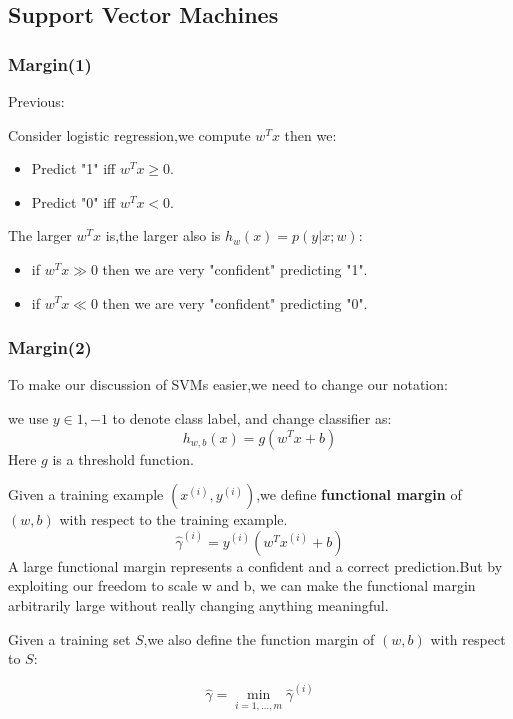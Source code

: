 \documentclass[slidestop,compress,mathserif]{beamer}
\begin{document}
    \subsection{Support Vector Machines}
    \begin{frame}[shrink]
        \frametitle{Margin(1)}
        Previous:

        Consider logistic regression,we compute $w^Tx$ then we:
        \begin{itemize}
          \item Predict "1" iff $w^Tx\ge 0$.
          \item Predict "0" iff $w^Tx<0$.
        \end{itemize}
        The larger $w^Tx$ is,the larger also is $h_w(x)=p(y|x;w)$:
        \begin{itemize}
          \item if $w^Tx \gg 0$ then we are very "confident" predicting "1".
          \item if $w^Tx \ll 0$ then we are very "confident" predicting "0".
        \end{itemize}
        \begin{figure}
        \end{figure}



    \end{frame}
    \begin{frame}[shrink]
        \frametitle{Margin(2)}
        To make our discussion of SVMs easier,we need to change our notation:

        we use $y \in {1,-1}$ to denote class label, and change classifier as:
        $$h_{w,b}(x)=g(w^Tx+b)$$
        Here $g$ is a threshold function.

        Given a training example $(x^{(i)},y^{(i)})$,we define \textbf{functional margin} of $(w,b)$ with respect to the training example.
        $$ \hat{\gamma}^{(i)}=y^{(i)}(w^Tx^{(i)}+b) $$
        A large functional margin represents a confident and a correct prediction.But by exploiting our freedom to scale w and b, we can make the functional margin arbitrarily large without really changing anything meaningful.

        Given a training set $S$,we also define the function margin of $(w, b)$ with respect to $S$:

        $$\hat{\gamma}= \min_{i=1,\ldots,m}\hat{\gamma}^{(i)}$$

    \end{frame}
\end{document}
